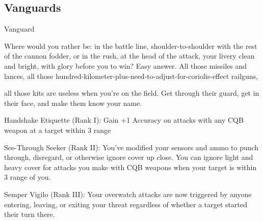 \subsection{Vanguards}
                                                   Vanguard  

Where would you rather be: in the battle line, shoulder-to-shoulder with the rest of the cannon fodder, or in  
the rush, at the head of the attack, your livery clean and bright, with glory before you to win? Easy answer.  
All those missiles and lances, all those hundred-kilometer-plus-need-to-adjust-for-coriolis-effect railguns,  

all those kits are useless when you’re on the field. Get through their guard, get in their face, and make them  
know your name.   

Handshake Etiquette (Rank I): Gain +1 Accuracy on attacks with any CQB weapon at a target  
within 3 range
 
See-Through Seeker (Rank II): You’ve modified your sensors and ammo to punch through,  
disregard, or otherwise ignore cover up close. You can ignore light and heavy cover for attacks  
you make with CQB weapons when your target is within 3 range of you.
 
Semper Vigilo (Rank III): Your overwatch attacks are now triggered by anyone entering, leaving,  
or exiting your threat regardless of whether a target started their turn there.